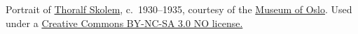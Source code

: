 Portrait of 
\href{http://www.oslobilder.no/OMU/OB.F06426c/image/70975}{Thoralf Skolem},
c.~1930--1935, courtesy of the
\href{http://www.oslomuseum.no/}{Museum of Oslo}. Used under a
\href{https://creativecommons.org/licenses/by-sa/3.0/no/}{Creative
Commons BY-NC-SA 3.0 NO license.}
